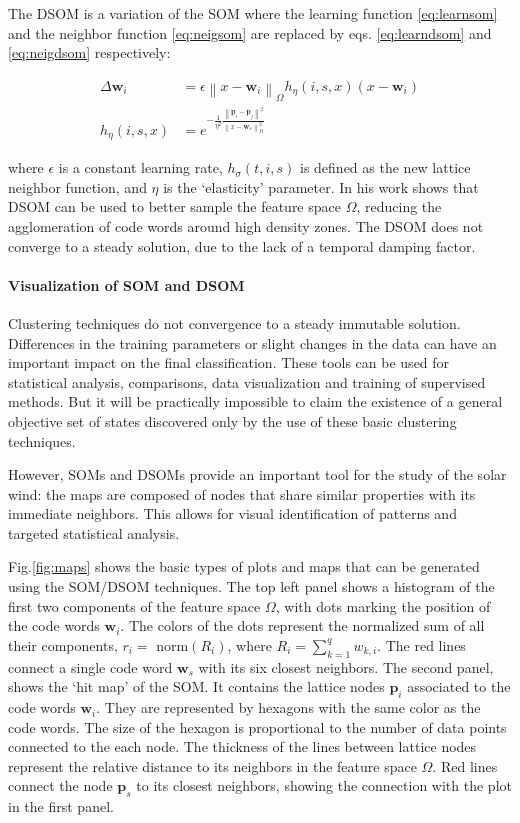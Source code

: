 The DSOM is a variation of the SOM where the learning function \eqref{eq:learnsom} and the neighbor function \eqref{eq:neigsom} are replaced by eqs. \eqref{eq:learndsom} and \eqref{eq:neigdsom} respectively:

\begin{align}
\Delta \boldsymbol{w}_i & = \epsilon \left\lVert x - \boldsymbol{w}_i \right\rVert_\Omega h_\eta(i,s,x)(x-\boldsymbol{w}_i) \label{eq:learndsom} \\
h_\eta(i,s,x) & = e^{-\frac{1}{\eta^2}\frac{\left\lVert \boldsymbol{p}_i - \boldsymbol{p}_j \right\rVert^2}{\left\lVert x - \boldsymbol{w}_s \right\rVert_\Omega^2}} \label{eq:neigdsom} 
\end{align}

where $\epsilon$ is a constant learning rate, $h_\sigma(t,i,s)$ is defined as the new lattice neighbor function, and $\eta$ is the `elasticity' parameter. In his work \citep{Rougier2011} shows that DSOM can be used to better sample the feature space $\Omega$, reducing the agglomeration of code words around high density zones. The DSOM does not converge to a steady solution, due to the lack of a temporal damping factor.

\paragraph{Visualization of SOM and DSOM}
Clustering techniques do not convergence to a steady immutable solution. Differences in the training parameters or slight changes in the data can have an important impact on the final classification. These tools can be used for statistical analysis, comparisons, data visualization and training of supervised methods. But it will be practically impossible to claim the existence of a general objective set of states discovered only by the use of these basic clustering techniques.

However, SOMs and DSOMs provide an important tool for the study of the solar wind: the maps are composed of nodes that share similar properties with its immediate neighbors. This allows for visual identification of patterns and targeted statistical analysis.

Fig.\ref{fig:maps} shows the basic types of plots and maps that can be generated using the SOM/DSOM techniques. The top left panel shows a histogram of the first two components of the feature space $\Omega$, with dots marking the position of the code words $\boldsymbol{w}_i$. The colors of the dots represent the normalized sum of all their components, $r_i =$ norm$(R_i)$, where $R_i = \sum_{k=1}^q w_{k,i}$. The red lines connect a single code word $\boldsymbol{w}_s$ with its six closest neighbors. The second panel, shows the `hit map' of the SOM. It contains the lattice nodes $\boldsymbol{p}_i$ associated to the code words $\boldsymbol{w}_i$. They are represented by hexagons with the same color as the code words. The size of the hexagon is proportional to the number of data points connected to the each node. The thickness of the lines between lattice nodes represent the relative distance to its neighbors in the feature space $\Omega$. Red lines connect the node $\boldsymbol{p}_s$ to its closest neighbors, showing the connection with the plot in the first panel.


